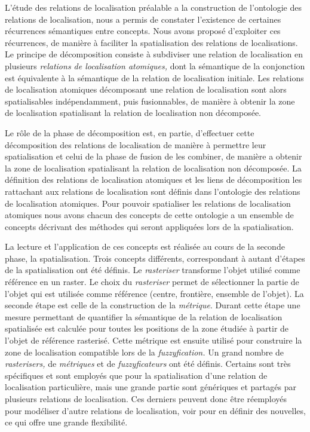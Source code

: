 L'étude des relations de localisation préalable a la construction de
l'ontologie des relations de localisation, nous a permis de constater
l’existence de certaines récurrences sémantiques entre concepts. Nous
avons proposé d'exploiter ces récurrences, de manière à faciliter la
spatialisation des relations de localisations. Le principe de
décomposition consiste à subdiviser une relation de localisation en
plusieurs \emph{relations de localisation atomiques,} dont la
sémantique de la conjonction est équivalente à la sémantique de la
relation de localisation initiale. Les relations de localisation
atomiques décomposant une relation de localisation sont alors
spatialisables indépendamment, puis fusionnables, de manière à obtenir
la zone de localisation spatialisant la relation de localisation non
décomposée.

Le rôle de la phase de décomposition est, en partie, d'effectuer cette
décomposition des relations de localisation de manière à permettre
leur spatialisation et celui de la phase de fusion de les combiner, de
manière a obtenir la zone de localisation spatialisant la relation de
localisation non décomposée. La définition des relations de
localisation atomiques et les liens de décomposition les rattachant
aux relations de localisation sont définis dans l'ontologie des
relations de localisation atomiques. Pour pouvoir spatialiser les
relations de localisation atomiques nous avons chacun des concepts de
cette ontologie a un ensemble de concepts décrivant des méthodes qui
seront appliquées lors de la spatialisation.

La lecture et l’application de ces concepts est réalisée au cours de
la seconde phase, la spatialisation. Trois concepts différents,
correspondant à autant d'étapes de la spatialisation ont été
définis. Le \emph{rasteriser} transforme l'objet utilisé comme
référence en un raster. Le choix du \emph{rasteriser} permet de
sélectionner la partie de l'objet qui est utilisée comme référence
(centre, frontière, ensemble de l'objet). La seconde étape est celle
de la construction de la \emph{métrique}. Durant cette étape une
mesure permettant de quantifier la sémantique de la relation de
localisation spatialisée est calculée pour toutes les positions de la
zone étudiée à partir de l'objet de référence rasterisé. Cette
métrique est ensuite utilisé pour construire la zone de localisation
compatible lors de la \emph{fuzzyfication.} Un grand nombre de
\emph{rasterisers,} de \emph{métriques} et de \emph{fuzzyficateurs}
ont été définis. Certains sont très spécifiques et sont employés que
pour la spatialisation d'une relation de localisation particulière,
mais une grande partie sont génériques et partagés par plusieurs
relations de localisation. Ces derniers peuvent donc être réemployés
pour modéliser d'autre relations de localisation, voir pour en définir
des nouvelles, ce qui offre une grande flexibilité.


